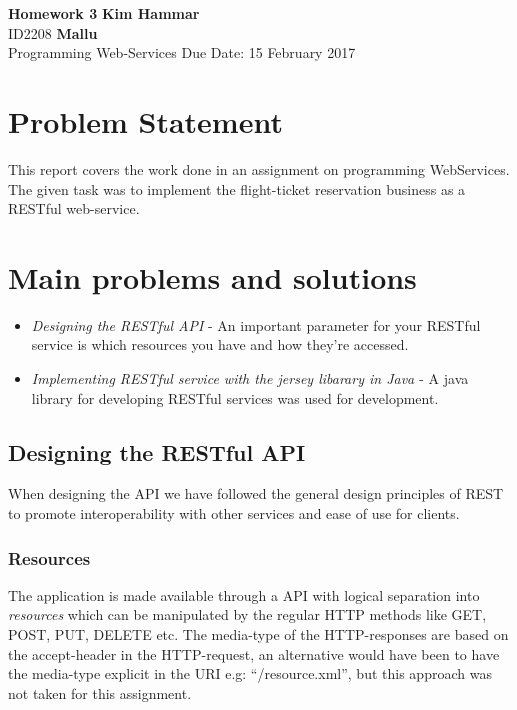 \documentclass[a4paper, 11pt]{article}
\begin{document}
\noindent
\large\textbf{Homework 3} \hfill \textbf{Kim Hammar} \\
\normalsize ID2208 \hfill  \textbf{Mallu} \\
Programming Web-Services \hfill Due Date: 15 February 2017\\

\section*{Problem Statement}
This report covers the work done in an assignment on programming WebServices. The given task was to implement the flight-ticket reservation business as a RESTful web-service.

\section*{Main problems and solutions}
\begin{itemize}
\item \textit{Designing the RESTful API} - An important parameter for your RESTful service is which resources you have and how they're accessed.
  
\item \textit{Implementing RESTful service with the jersey libarary in Java \citep{jersey}} - A java library for developing RESTful services was used for development.
\end{itemize}

\subsection*{Designing the RESTful API}
When designing the API we have followed the general design principles of REST to promote interoperability with other services and ease of use for clients.

\subsubsection*{Resources}
The application is made available through a API with logical separation into \textit{resources} which can be manipulated by the regular HTTP methods like GET, POST, PUT, DELETE etc. The media-type of the HTTP-responses are based on the accept-header in the HTTP-request, an alternative would have been to have the media-type explicit in the URI e.g: ``/resource.xml'', but this approach was not taken for this assignment.
\end{document}
